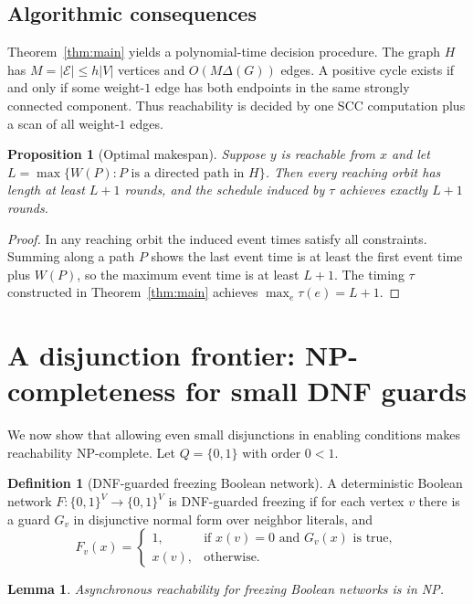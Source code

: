 \documentclass[final,3p,times]{elsarticle}
\newtheorem{lemma}[theorem]{Lemma}
\newtheorem{proposition}[theorem]{Proposition}
\theoremstyle{definition}
\newtheorem{definition}[theorem]{Definition}
\theoremstyle{remark}
\newcommand{\cE}{\mathcal{E}}
\begin{document}
\subsection*{Algorithmic consequences}

Theorem~\ref{thm:main} yields a polynomial-time decision procedure.
The graph $H$ has $M=|\cE|\le h|V|$ vertices and $O(M\Delta(G))$ edges.
A positive cycle exists if and only if some weight-$1$ edge has both endpoints in the same strongly connected component.
Thus reachability is decided by one SCC computation plus a scan of all weight-$1$ edges.

\begin{proposition}[Optimal makespan]\label{prop:makespan}
Suppose $y$ is reachable from $x$ and let $L=\max\{W(P):P\text{ is a directed path in }H\}$.
Then every reaching orbit has length at least $L+1$ rounds, and the schedule induced by $\tau$ achieves exactly $L+1$ rounds.
\end{proposition}

\begin{proof}
In any reaching orbit the induced event times satisfy all constraints.
Summing along a path $P$ shows the last event time is at least the first event time plus $W(P)$, so the maximum event time is at least $L+1$.
The timing $\tau$ constructed in Theorem~\ref{thm:main} achieves $\max_e\tau(e)=L+1$.
\end{proof}

\section{A disjunction frontier: NP-completeness for small DNF guards}

We now show that allowing even small disjunctions in enabling conditions makes reachability NP-complete.
Let $Q=\{0,1\}$ with order $0<1$.

\begin{definition}[DNF-guarded freezing Boolean network]
A deterministic Boolean network $F\colon\{0,1\}^V\to\{0,1\}^V$ is DNF-guarded freezing if for each vertex $v$ there is a guard $G_v$ in disjunctive normal form over neighbor literals, and
\[
F_v(x)=
\begin{cases}
1,&\text{if }x(v)=0\text{ and }G_v(x)\text{ is true},\\
x(v),&\text{otherwise.}
\end{cases}
\]
\end{definition}

\begin{lemma}\label{lem:np}
Asynchronous reachability for freezing Boolean networks is in NP.
\end{lemma}
\end{document}
